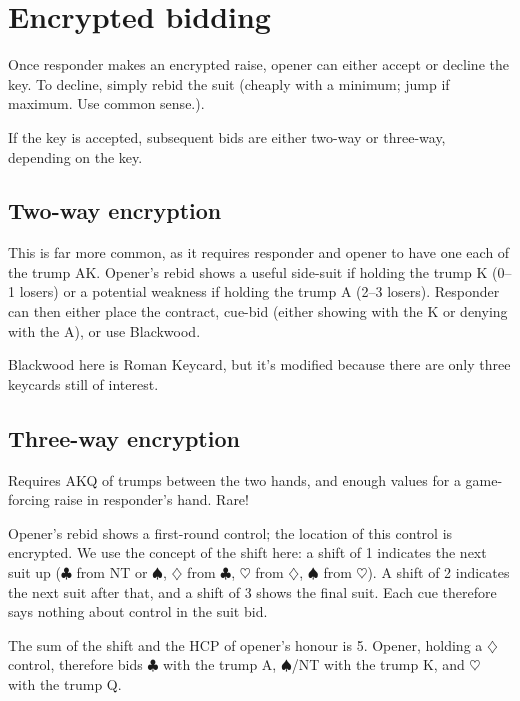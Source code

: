 \documentclass[a4paper,14pt]{extarticle}
\begin{document}
\newpage

\section{Encrypted bidding}
\label{sec:encryption}

Once responder makes an encrypted raise, opener can either accept or decline
the key.  To decline, simply rebid the suit (cheaply with a minimum; jump if
maximum.  Use common sense.).

If the key is accepted, subsequent bids are either two-way or three-way, depending on the key.

\subsection{Two-way encryption}
\label{sec:enc:2way}

This is far more common, as it requires responder and opener to have one each
of the trump AK. Opener's rebid shows a useful side-suit if holding the trump
K (0--1 losers) or a potential weakness if holding the trump A (2--3 losers).
Responder can then either place the contract, cue-bid (either showing with the
K or denying with the A), or use Blackwood.

Blackwood here is Roman Keycard, but it's modified because there are only three keycards
still of interest.

\subsection{Three-way encryption}
\label{sec:enc:3way}

Requires AKQ of trumps between the two hands, and enough values for a
game-forcing raise in responder's hand.  Rare!

Opener's rebid shows a first-round control; the location of this control is
encrypted.  We use the concept of the shift here: a shift of 1 indicates the
next suit up ($\clubsuit$ from NT or $\spadesuit$, $\diamondsuit$ from $\clubsuit$, $\heartsuit$ from $\diamondsuit$, $\spadesuit$ from $\heartsuit$).  A shift of 2
indicates the next suit after that, and a shift of 3 shows the final suit.
Each cue therefore says nothing about control in the suit bid.

The sum of the shift and the HCP of opener's honour is 5.  Opener, holding a $\diamondsuit$
control, therefore bids $\clubsuit$ with the trump A, $\spadesuit$/NT with the trump K, and $\heartsuit$ with
the trump Q.
\end{document}
